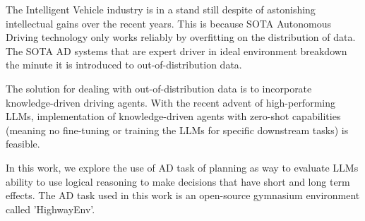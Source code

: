  \begin{spacing}{1.5} 
 \begin{sloppypar}
 The Intelligent Vehicle industry is in a stand still despite of astonishing intellectual gains over the recent years. This is because SOTA Autonomous Driving technology only works reliably by overfitting on the distribution of data. The SOTA AD systems that are expert driver in ideal environment breakdown the minute it is introduced to out-of-distribution data. 
 \end{sloppypar}
  \end{spacing}


  \begin{spacing}{1.5} 
  \begin{sloppypar}
  The solution for dealing with out-of-distribution data is to incorporate knowledge-driven driving agents. With the recent advent of high-performing LLMs, implementation of knowledge-driven agents with zero-shot capabilities (meaning no fine-tuning or training the LLMs for specific downstream tasks) is feasible. 
  \end{sloppypar}
   \end{spacing}

\begin{spacing}{1.5} 
\begin{sloppypar}
In this work, we explore the use of AD task of planning as way to evaluate LLMs ability to use logical reasoning to make decisions that have short and long term effects. The AD task used in this work is an open-source gymnasium environment called 'HighwayEnv'.
\end{sloppypar}
 \end{spacing}
 
